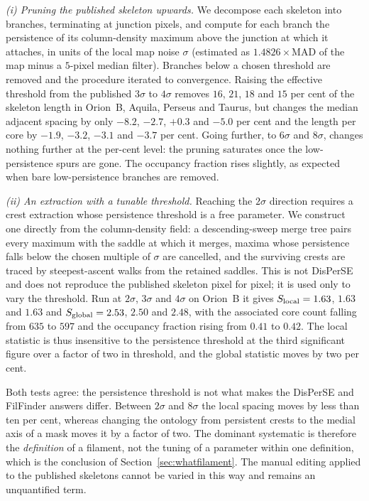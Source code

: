 \documentclass[usenatbib,twoside,twocolumn]{mnras}
\begin{document}
\smallskip\noindent\emph{(i) Pruning the published skeleton upwards.} We decompose each skeleton into branches, terminating at junction pixels, and compute for each branch the persistence of its column-density maximum above the junction at which it attaches, in units of the local map noise $\sigma$ (estimated as $1.4826\times$MAD of the map minus a $5$-pixel median filter). Branches below a chosen threshold are removed and the procedure iterated to convergence. Raising the effective threshold from the published $3\sigma$ to $4\sigma$ removes $16$, $21$, $18$ and $15$ per cent of the skeleton length in Orion~B, Aquila, Perseus and Taurus, but changes the median adjacent spacing by only $-8.2$, $-2.7$, $+0.3$ and $-5.0$ per cent and the length per core by $-1.9$, $-3.2$, $-3.1$ and $-3.7$ per cent. Going further, to $6\sigma$ and $8\sigma$, changes nothing further at the per-cent level: the pruning saturates once the low-persistence spurs are gone. The occupancy fraction rises slightly, as expected when bare low-persistence branches are removed.

\smallskip\noindent\emph{(ii) An extraction with a tunable threshold.} Reaching the $2\sigma$ direction requires a crest extraction whose persistence threshold is a free parameter. We construct one directly from the column-density field: a descending-sweep merge tree pairs every maximum with the saddle at which it merges, maxima whose persistence falls below the chosen multiple of $\sigma$ are cancelled, and the surviving crests are traced by steepest-ascent walks from the retained saddles. This is not DisPerSE and does not reproduce the published skeleton pixel for pixel; it is used only to vary the threshold. Run at $2\sigma$, $3\sigma$ and $4\sigma$ on Orion~B it gives $S_{\rm local}=1.63$, $1.63$ and $1.63$ and $S_{\rm global}=2.53$, $2.50$ and $2.48$, with the associated core count falling from $635$ to $597$ and the occupancy fraction rising from $0.41$ to $0.42$. The local statistic is thus insensitive to the persistence threshold at the third significant figure over a factor of two in threshold, and the global statistic moves by two per cent.

\smallskip\noindent Both tests agree: the persistence threshold is not what makes the DisPerSE and FilFinder answers differ. Between $2\sigma$ and $8\sigma$ the local spacing moves by less than ten per cent, whereas changing the ontology from persistent crests to the medial axis of a mask moves it by a factor of two. The dominant systematic is therefore the \emph{definition} of a filament, not the tuning of a parameter within one definition, which is the conclusion of Section~\ref{sec:whatfilament}. The manual editing applied to the published skeletons cannot be varied in this way and remains an unquantified term.
\end{document}
